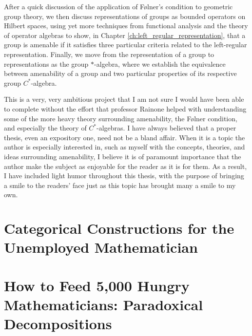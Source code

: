 \documentclass[10pt]{package2}
\begin{document}
After a quick discussion of the application of Følner's condition to geometric group theory, we then discuss representations of groups as bounded operators on Hilbert spaces, using yet more techniques from functional analysis and the theory of operator algebras to show, in Chapter \ref{ch:left_regular_representation}, that a group is amenable if it satisfies three particular criteria related to the left-regular representation. Finally, we move from the representation of a group to representations as the group $\ast$-algebra, where we establish the equivalence between amenability of a group and two particular properties of its respective group $C^{\ast}$-algebra.\newline

This is a very, very ambitious project that I am not sure I would have been able to complete without the effort that professor Rainone helped with understanding some of the more heavy theory surrounding amenability, the Følner condition, and especially the theory of $C^{\ast}$-algebras. I have always believed that a proper thesis, even an expository one, need not be a bland affair. When it is a topic the author is especially interested in, such as myself with the concepts, theories, and ideas surrounding amenability, I believe it is of paramount importance that the author make the subject as enjoyable for the reader as it is for them. As a result, I have included light humor throughout this thesis, with the purpose of bringing a smile to the readers' face just as this topic has brought many a smile to my own.
\chapter{Categorical Constructions for the Unemployed Mathematician}\label{ch:categorical_constructions}

\chapter{How to Feed 5,000 Hungry Mathematicians: Paradoxical Decompositions}\label{ch:paradoxical_decompositions}

\end{document}
